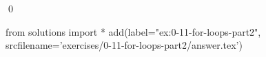 
\begin{ex}
  \label{ex:0-11-for-loops-part2}
  
  \qed
\end{ex}
\begin{python0}
from solutions import *
add(label="ex:0-11-for-loops-part2",
    srcfilename='exercises/0-11-for-loops-part2/answer.tex')
\end{python0}
